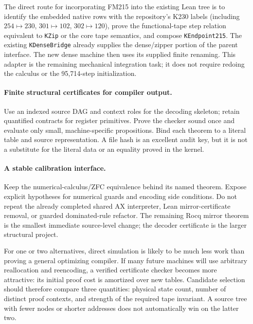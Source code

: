 \documentclass[11pt,a4paper]{article}
\begin{document}
The direct route for incorporating FM215 into the existing Lean tree is
to identify the embedded native rows with the repository's K230 labels
(including $254\mapsto230$, $301\mapsto102$, $302\mapsto120$), prove the
functional-tape step relation equivalent to \texttt{KZip} or the core tape
semantics, and compose \texttt{KEndpoint215}. The existing
\texttt{KDenseBridge} already supplies the dense/zipper portion of the
parent interface. The new dense machine then uses its supplied finite
renaming. This adapter is the remaining mechanical integration task; it
does not require redoing the calculus or the 95,714-step initialization.

\paragraph{Finite structural certificates for compiler output.}
Use an indexed source DAG and context roles for the decoding skeleton;
retain quantified contracts for register primitives. Prove the checker
sound once and evaluate only small, machine-specific propositions. Bind
each theorem to a literal table and source representation. A file hash is
an excellent audit key, but it is not a substitute for the literal data
or an equality proved in the kernel.

\paragraph{A stable calibration interface.}
Keep the numerical-calculus/ZFC equivalence behind its named theorem.
Expose explicit hypotheses for numerical guards and encoding side
conditions. Do not repeat the already completed shared AX interpreter,
Lean mirror-certificate removal, or guarded dominated-rule refactor.
The remaining Rocq mirror theorem is the smallest immediate source-level
change; the decoder certificate is the larger structural project.
\cite{phase3,source215,offsetbisim,leansim}

For one or two alternatives, direct simulation is likely to be much less
work than proving a general optimizing compiler. If many future machines
will use arbitrary reallocation and reencoding, a verified certificate
checker becomes more attractive: its initial proof cost is amortized over
new tables. Candidate selection should therefore compare three quantities:
physical state count, number of distinct proof contexts, and strength of
the required tape invariant. A source tree with fewer nodes or shorter
addresses does not automatically win on the latter two.
\end{document}
